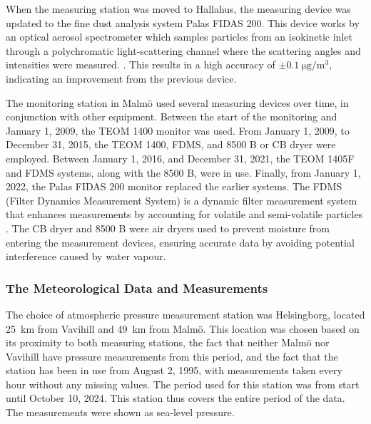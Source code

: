When the measuring station was moved to Hallahus, the measuring device was updated to the fine dust analysis system Palas FIDAS 200. This device works by an optical aerosol spectrometer which samples particles from an isokinetic inlet through a polychromatic light-scattering channel where the scattering angles and intensities were measured. \cite{palasgmbhOperatingManualFidas}. This results in a high accuracy of $\pm\SI{0.1}{\micro\gram\per\meter\cubed}$, indicating an improvement from the previous device. 

The monitoring station in Malmö used several measuring devices over time, in conjunction with other equipment. Between the start of the monitoring and January 1, 2009, the TEOM 1400 monitor was used. From January 1, 2009, to December 31, 2015, the TEOM 1400, FDMS, and 8500 B or CB dryer were employed. Between January 1, 2016, and December 31, 2021, the TEOM 1405F and FDMS systems, along with the 8500 B, were in use. Finally, from January 1, 2022, the Palas FIDAS 200 monitor replaced the earlier systems. The FDMS (Filter Dynamics Measurement System) is a dynamic filter measurement system that enhances measurements by accounting for volatile and semi-volatile particles \cite{thermoscientific8500FDMSFilter2010}. The CB dryer and 8500 B were air dryers used to prevent moisture from entering the measurement devices, ensuring accurate data by avoiding potential interference caused by water vapour.

\subsubsection{The Meteorological Data and Measurements}
The choice of atmospheric pressure measurement station was Helsingborg, located \SI{25}{\km} from Vavihill and \SI{49}{\km} from Malmö. This location was chosen based on its proximity to both \PM measuring stations, the fact that neither Malmö nor Vavihill have pressure measurements from this period, and the fact that the station has been in use from August 2, 1995, with measurements taken every hour without any missing values. The period used for this station was from start until October 10, 2024. This station thus covers the entire period of the \PM data. The measurements were shown as sea-level pressure.

